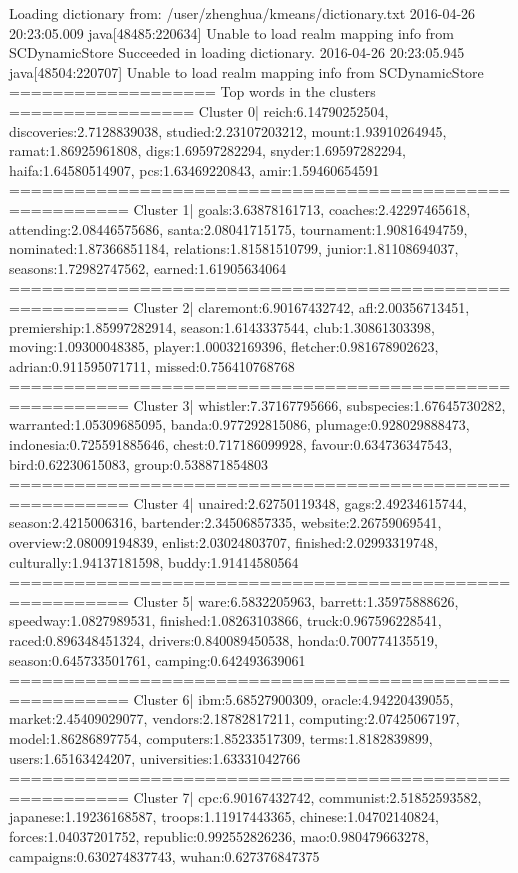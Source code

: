 Loading dictionary from: /user/zhenghua/kmeans/dictionary.txt
2016-04-26 20:23:05.009 java[48485:220634] Unable to load realm mapping info from SCDynamicStore
Succeeded in loading dictionary.
2016-04-26 20:23:05.945 java[48504:220707] Unable to load realm mapping info from SCDynamicStore
=================== Top words in the clusters ================= 
Cluster 0| reich:6.14790252504, discoveries:2.7128839038, studied:2.23107203212, mount:1.93910264945, ramat:1.86925961808, digs:1.69597282294, snyder:1.69597282294, haifa:1.64580514907, pcs:1.63469220843, amir:1.59460654591
========================================================= 
Cluster 1| goals:3.63878161713, coaches:2.42297465618, attending:2.08446575686, santa:2.08041715175, tournament:1.90816494759, nominated:1.87366851184, relations:1.81581510799, junior:1.81108694037, seasons:1.72982747562, earned:1.61905634064
========================================================= 
Cluster 2| claremont:6.90167432742, afl:2.00356713451, premiership:1.85997282914, season:1.6143337544, club:1.30861303398, moving:1.09300048385, player:1.00032169396, fletcher:0.981678902623, adrian:0.911595071711, missed:0.756410768768
========================================================= 
Cluster 3| whistler:7.37167795666, subspecies:1.67645730282, warranted:1.05309685095, banda:0.977292815086, plumage:0.928029888473, indonesia:0.725591885646, chest:0.717186099928, favour:0.634736347543, bird:0.62230615083, group:0.538871854803
========================================================= 
Cluster 4| unaired:2.62750119348, gags:2.49234615744, season:2.4215006316, bartender:2.34506857335, website:2.26759069541, overview:2.08009194839, enlist:2.03024803707, finished:2.02993319748, culturally:1.94137181598, buddy:1.91414580564
========================================================= 
Cluster 5| ware:6.5832205963, barrett:1.35975888626, speedway:1.0827989531, finished:1.08263103866, truck:0.967596228541, raced:0.896348451324, drivers:0.840089450538, honda:0.700774135519, season:0.645733501761, camping:0.642493639061
========================================================= 
Cluster 6| ibm:5.68527900309, oracle:4.94220439055, market:2.45409029077, vendors:2.18782817211, computing:2.07425067197, model:1.86286897754, computers:1.85233517309, terms:1.8182839899, users:1.65163424207, universities:1.63331042766
========================================================= 
Cluster 7| cpc:6.90167432742, communist:2.51852593582, japanese:1.19236168587, troops:1.11917443365, chinese:1.04702140824, forces:1.04037201752, republic:0.992552826236, mao:0.980479663278, campaigns:0.630274837743, wuhan:0.627376847375
